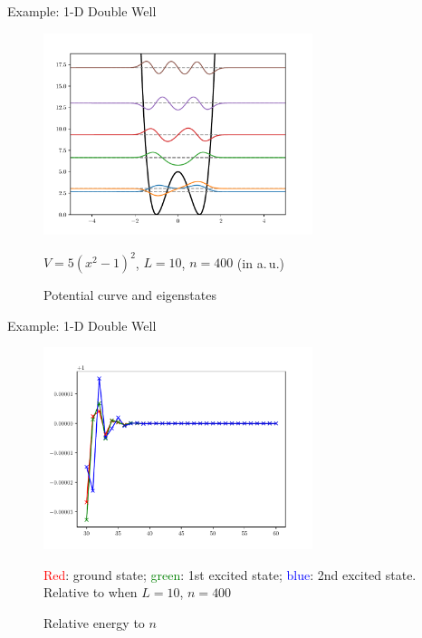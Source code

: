 \documentclass[12pt]{beamer}
\begin{document}
    \begin{frame}{Example: 1-D Double Well}
        \begin{figure}
            \includegraphics[width=0.7\textwidth]{w-well-eigenstates-FastSineDVR.pdf}
            \caption{Potential curve and eigenstates}
            \footnotesize%
            $V = 5( x^2 - 1 )^2$, $L = 10$, $n = 400$ (in a.\,u.)
        \end{figure}
    \end{frame}

    \begin{frame}{Example: 1-D Double Well}
        \begin{figure}
            \includegraphics[width=0.7\textwidth]{percentage-SineDVR.pdf}
            \caption{Relative energy to $n$}
            \footnotesize
            \textcolor{red}{Red}: ground state; \textcolor{green}{green}: 1st excited state; \textcolor{blue}{blue}: 2nd excited state. Relative to when $L = 10$, $n = 400$
        \end{figure}
    \end{frame}
\end{document}
